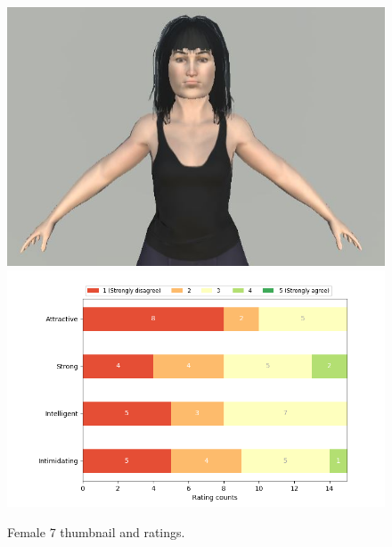 \begin{figure}[H]
  \includegraphics[width=\linewidth]{Images/Females/7.JPG}
\endminipage\hfill
{}
  \includegraphics[width=\linewidth]{Survey/FRatings/avatar_f7.png}
\endminipage\hfill
\caption{Female 7 thumbnail and ratings.}
\end{figure}


